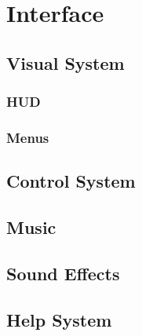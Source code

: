 \documentclass[12pt,titlepage]{article}
\begin{document}



\newpage
\section{Interface}

\subsection{Visual System}

\subsubsection{HUD}

\subsubsection{Menus}

\subsection{Control System}

\subsection{Music}

\subsection{Sound Effects}

\subsection{Help System}

\newpage
\end{document}
